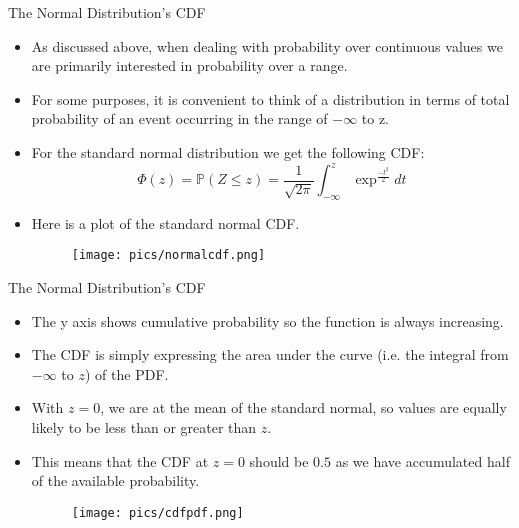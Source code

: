 \documentclass[handout]{beamer}
\begin{document}
\begin{frame}{The Normal Distribution’s CDF}

\scriptsize{
\begin{itemize}
 \item As discussed above, when dealing with probability over continuous values we are primarily interested in probability over a range.
 \item For some purposes, it is convenient to think of a distribution in terms of total probability of an event occurring in the range of $-\infty$ to z.
 \item  For the standard normal distribution we get the following CDF:
 \begin{displaymath}
  \Phi(z)= \mathbb{P}(Z \leq z) = \frac{1}{\sqrt{2\pi}}\int_{-\infty}^{z} \exp^{\frac{-t^2}{2}}dt 
 \end{displaymath}
\item Here is a plot of the standard normal CDF.

   \begin{figure}[h!]
	\centering
	\texttt{[image: pics/normalcdf.png]}
\end{figure}
 
 \end{itemize}

}
\end{frame}


\begin{frame}{The Normal Distribution’s CDF}

\scriptsize{
\begin{itemize}
\item The y axis shows cumulative probability so  the function is always increasing.
 
\item The CDF is simply expressing the area under the curve (i.e. the integral from $-\infty$ to $z$) of the PDF. 
 
\item With $z = 0$, we are at the mean of the standard normal, so values are equally likely to be less than or greater than $z$. 

\item This means that the CDF at $z = 0$ should be $0.5$ as we have accumulated half of the available probability. 

   \begin{figure}[h!]
	\centering
	\texttt{[image: pics/cdfpdf.png]}
\end{figure}

 
 \end{itemize}

}
\end{frame}
\end{document}
